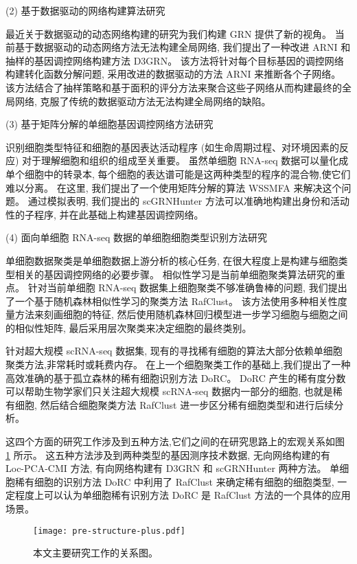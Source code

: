 (2) 基于数据驱动的网络构建算法研究

最近关于数据驱动的动态网络构建的研究为我们构建 GRN 提供了新的视角。
当前基于数据驱动的动态网络方法无法构建全局网络,
我们提出了一种改进 ARNI 和抽样的基因调控网络构建方法 D3GRN。
该方法将针对每个目标基因的调控网络构建转化函数分解问题,
采用改进的数据驱动的方法 ARNI 来推断各个子网络。
该方法结合了抽样策略和基于面积的评分方法来聚合这些子网络从而构建最终的全局网络,
克服了传统的数据驱动方法无法构建全局网络的缺陷。

(3) 基于矩阵分解的单细胞基因调控网络方法研究

识别细胞类型特征和细胞的基因表达活动程序 (如生命周期过程、对环境因素的反应) 对于理解细胞和组织的组成至关重要。
虽然单细胞 RNA-seq 数据可以量化成单个细胞中的转录本,
每个细胞的表达谱可能是这两种类型的程序的混合物,使它们难以分离。
在这里, 我们提出了一个使用矩阵分解的算法 WSSMFA 来解决这个问题。
通过模拟表明, 我们提出的 scGRNHunter 方法可以准确地构建出身份和活动性的子程序, 
并在此基础上构建基因调控网络。


(4) 面向单细胞 RNA-seq 数据的单细胞细胞类型识别方法研究

单细胞数据聚类是单细胞数据上游分析的核心任务, 
在很大程度上是构建与细胞类型相关的基因调控网络的必要步骤。
相似性学习是当前单细胞聚类算法研究的重点。
针对当前单细胞 RNA-seq 数据集上细胞聚类不够准确鲁棒的问题,
我们提出了一个基于随机森林相似性学习的聚类方法 RafClust。
该方法使用多种相关性度量方法来刻画细胞的特征, 
然后使用随机森林回归模型进一步学习细胞与细胞之间的相似性矩阵,
最后采用层次聚类来决定细胞的最终类别。

针对超大规模 scRNA-seq 数据集,
现有的寻找稀有细胞的算法大部分依赖单细胞聚类方法,非常耗时或耗费内存。
在上一个细胞聚类工作的基础上,我们提出了一种高效准确的基于孤立森林的稀有细胞识别方法 DoRC。
DoRC 产生的稀有度分数可以帮助生物学家们只关注超大规模 scRNA-seq 数据内一部分的细胞, 也就是稀有细胞,
然后结合细胞聚类方法 RafClust 进一步区分稀有细胞类型和进行后续分析。

这四个方面的研究工作涉及到五种方法,它们之间的在研究思路上的宏观关系如图 \ref{fig:pre-structure} 所示。
这五种方法涉及到两种类型的基因测序技术数据, 无向网络构建的有 Loc-PCA-CMI 方法, 有向网络构建有 D3GRN 和 scGRNHunter 两种方法。 
单细胞稀有细胞的识别方法 DoRC 中利用了 RafClust 来确定稀有细胞的细胞类型,
一定程度上可以认为单细胞稀有识别方法 DoRC 是 RafClust 方法的一个具体的应用场景。
\begin{figure}[!htbp]
    \centering
    \texttt{[image: pre-structure-plus.pdf]}
    \caption{本文主要研究工作的关系图。}
    \label{fig:pre-structure}
\end{figure}

